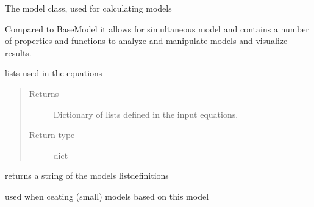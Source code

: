 \documentclass[letterpaper,10pt,english]{sphinxmanual}
\begin{document}
\begin{fulllineitems}
\label{\detokenize{index:modelclass.Org_model_Mixin}}
\pysigstartsignatures
{}
\pysigstopsignatures
\sphinxAtStartPar
The model class, used for calculating models

\sphinxAtStartPar
Compared to BaseModel it allows for simultaneous model and contains a number of properties
and functions to analyze and manipulate models and visualize results.

\begin{fulllineitems}
\label{\detokenize{index:modelclass.Org_model_Mixin.lister}}
\pysigstartsignatures
{}
\pysigstopsignatures
\sphinxAtStartPar
lists used in the equations
\begin{quote}\begin{description}
\item[{Returns}] \leavevmode
\sphinxAtStartPar
Dictionary of lists defined in the input equations.

\item[{Return type}] \leavevmode
\sphinxAtStartPar
dict

\end{description}\end{quote}

\end{fulllineitems}


\begin{fulllineitems}
\label{\detokenize{index:modelclass.Org_model_Mixin.listud}}
\pysigstartsignatures
{}
\pysigstopsignatures
\sphinxAtStartPar
returns a string of the models listdefinitions

\sphinxAtStartPar
used when ceating (small) models based on this model

\end{fulllineitems}



\end{fulllineitems}
\end{document}
